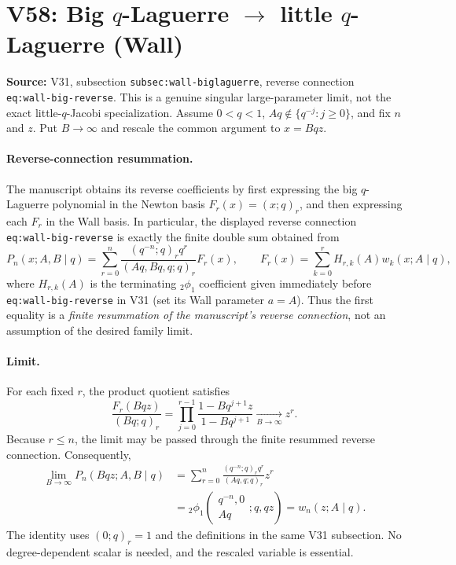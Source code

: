 \documentclass[11pt]{article}
\begin{document}
\section{V58: Big $q$-Laguerre $\longrightarrow$ little $q$-Laguerre (Wall)}
\noindent\textbf{Source:} V31, subsection \texttt{subsec:wall-biglaguerre}, reverse connection \texttt{eq:wall-big-reverse}. This is a genuine singular large-parameter limit, not the exact little-$q$-Jacobi specialization. Assume $0<q<1$, $Aq\notin\{q^{-j}:j\ge0\}$, and fix $n$ and $z$. Put $B\to\infty$ and rescale the common argument to $x=Bqz$.

\paragraph{Reverse-connection resummation.}
The manuscript obtains its reverse coefficients by first expressing the big $q$-Laguerre polynomial in the Newton basis $F_r(x)=(x;q)_r$, and then expressing each $F_r$ in the Wall basis. In particular, the displayed reverse connection \texttt{eq:wall-big-reverse} is exactly the finite double sum obtained from
\begin{equation}\label{eq:v58-reverse-resum}
 P_n(x;A,B\mid q)
 =\sum_{r=0}^n\frac{(q^{-n};q)_r q^r}{(Aq,Bq,q;q)_r}F_r(x),
 \qquad
 F_r(x)=\sum_{k=0}^r H_{r,k}(A)w_k(x;A\mid q),
\end{equation}
where $H_{r,k}(A)$ is the terminating ${}_2\phi_1$ coefficient given immediately before \texttt{eq:wall-big-reverse} in V31 (set its Wall parameter $a=A$). Thus the first equality is a \emph{finite resummation of the manuscript's reverse connection}, not an assumption of the desired family limit.

\paragraph{Limit.}
For each fixed $r$, the product quotient satisfies
\begin{equation}\label{eq:v58-product}
 \frac{F_r(Bqz)}{(Bq;q)_r}
 =\prod_{j=0}^{r-1}\frac{1-Bq^{j+1}z}{1-Bq^{j+1}}
 \xrightarrow[B\to\infty]{} z^r.
\end{equation}
Because $r\le n$, the limit may be passed through the finite resummed reverse connection. Consequently,
\begin{align}
\lim_{B\to\infty}P_n(Bqz;A,B\mid q)
 &=\sum_{r=0}^n\frac{(q^{-n};q)_r q^r}{(Aq,q;q)_r}z^r\\
 &={}_2\phi_1\!\left(\begin{matrix}q^{-n},0\\Aq\end{matrix};q,qz\right)
 =w_n(z;A\mid q).
\end{align}
The identity uses $(0;q)_r=1$ and the definitions in the same V31 subsection. No degree-dependent scalar is needed, and the rescaled variable is essential.
\end{document}
